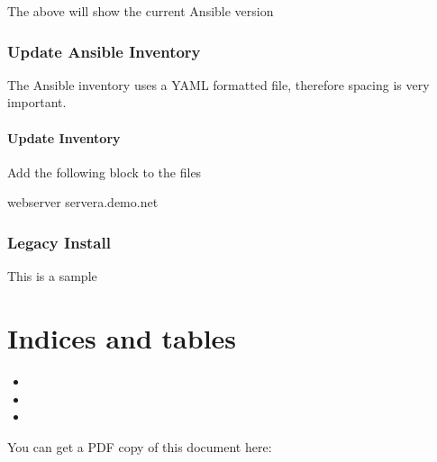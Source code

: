 \documentclass[letterpaper,10pt,english]{sphinxmanual}
\begin{document}
\sphinxAtStartPar
The above will show the current Ansible version


\subsection{Update Ansible Inventory}
\label{\detokenize{procedures:update-ansible-inventory}}
\sphinxAtStartPar
The Ansible inventory uses a YAML formatted file, therefore spacing is very important.


\subsubsection{Update Inventory}
\label{\detokenize{procedures:update-inventory}}
\sphinxAtStartPar
Add the following block to the  files

\begin{sphinxVerbatim}[commandchars=\\\{\}]
\PYG{o}{[}webserver\PYG{o}{]}
servera.demo.net
\end{sphinxVerbatim}


\subsection{Legacy Install}
\label{\detokenize{legacy/legacy-install:legacy-install}}\label{\detokenize{legacy/legacy-install::doc}}
\sphinxAtStartPar
This is a sample


\chapter{Indices and tables}
\label{\detokenize{index:indices-and-tables}}\begin{itemize}
\item {} 
\sphinxAtStartPar
{}

\item {} 
\sphinxAtStartPar
{}

\item {} 
\sphinxAtStartPar
{}

\end{itemize}

\sphinxAtStartPar
You can get a PDF copy of this document here: 



\renewcommand{\indexname}{Index}
\printindex
\end{document}
